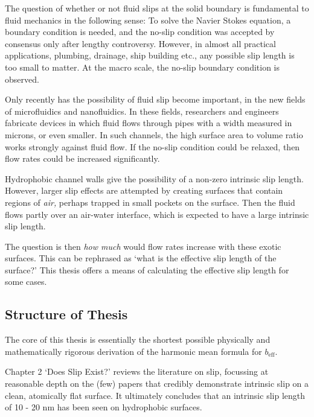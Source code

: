 \documentclass[a4paper]{report}
\newcommand{\beff}{\ensuremath{b_{\mathrm{eff}}}}
\begin{document}

The question of whether or not fluid slips at the solid boundary is fundamental to fluid mechanics in the following sense: To solve the Navier Stokes equation, a boundary condition is needed, and the no-slip condition was accepted by consensus only after lengthy controversy.
However, in almost all practical applications, plumbing, drainage, ship building etc., any possible slip length is too small to matter.  At the macro scale, the no-slip boundary condition is observed.

Only recently has the possibility of fluid slip become important, in the new fields of microfluidics and nanofluidics.  In these fields, researchers and engineers fabricate devices in which fluid flows through pipes with a width measured in microns, or even smaller.  In such channels, the high surface area to volume ratio works strongly against fluid flow.  If the no-slip condition could be relaxed, then flow rates could be increased significantly.

Hydrophobic channel walls give the possibility of a non-zero intrinsic slip length.  However, larger slip effects are attempted by creating surfaces that contain regions of \emph{air,} perhaps trapped in small pockets on the surface.  Then the fluid flows partly over an air-water interface, which is expected to have a large intrinsic slip length.

The question is then \emph{how much} would flow rates increase with these exotic surfaces.  This can be rephrased as `what is the effective slip length of the surface?'  This thesis offers a means of calculating the effective slip length for some cases.

\clearpage

\subsection*{Structure of Thesis}

The core of this thesis is essentially the shortest possible physically and mathematically rigorous derivation of the harmonic mean formula for $\beff$.  

Chapter 2 `Does Slip Exist?' reviews the literature on slip, focussing at reasonable depth on the (few) papers that credibly demonstrate intrinsic slip on a clean, atomically flat surface.  It ultimately concludes that an intrinsic slip length of 10 - 20 nm has been seen on hydrophobic surfaces.
\end{document}
